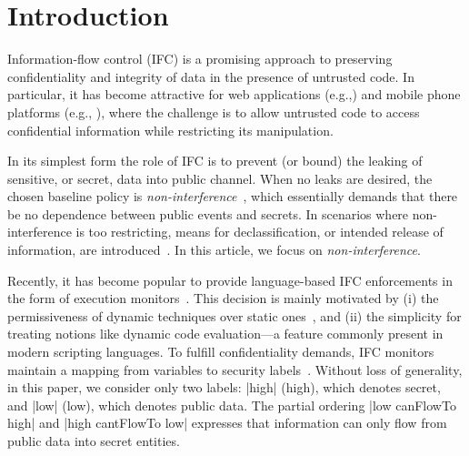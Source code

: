 \section{Introduction}
\label{sec:intro}

Information-flow control (IFC) is a promising approach to preserving
confidentiality and integrity of data in the presence of untrusted code.  In
particular, it has become attractive for web 
applications (e.g.,\cite{DeGroef:2012:FWB:2382196.2382275, giffin:hails,
  yang:2013:towards, conf/esorics/AkhaweLHSS13, Hedin13}) and mobile phone
platforms (e.g., \cite{Enck:2010,android:esorics13}), where the challenge is
to allow untrusted code to access confidential information while restricting its
manipulation.

In its simplest form the role of IFC is to prevent (or bound) the leaking of
sensitive, or secret, data into public channel.  When no leaks are desired, the
chosen baseline policy is
\emph{non-interference}~\cite{Goguen:Meseguer:Noninterference}, which
essentially demands that there be no dependence between public events and
secrets. In scenarios where non-interference is too restricting, means for
declassification, or intended release of information, are
introduced~\cite{Sabelfeld:Sands:CSFW05}. In this article, we focus on
\emph{non-interference}. 

Recently, it has become popular to provide language-based IFC enforcements in
the form of execution monitors~\cite{Hedin2011}. This decision is mainly
motivated by (i) the permissiveness of dynamic techniques over static
ones~\cite{Sabelfeld:Russo:PSI09}, and (ii) the simplicity for treating notions
like dynamic code evaluation---a feature commonly present in modern scripting
languages. To fulfill confidentiality demands, IFC monitors maintain a
mapping from variables to security labels~\cite{myers:dlm,Stefan:2011}.  
Without loss of generality, in this paper, we consider only two labels: |high|
(high), which denotes secret, and |low| (low), which denotes public data. The
partial ordering |low canFlowTo high| and |high cantFlowTo low| expresses that
information can only flow from public data into secret entities.

